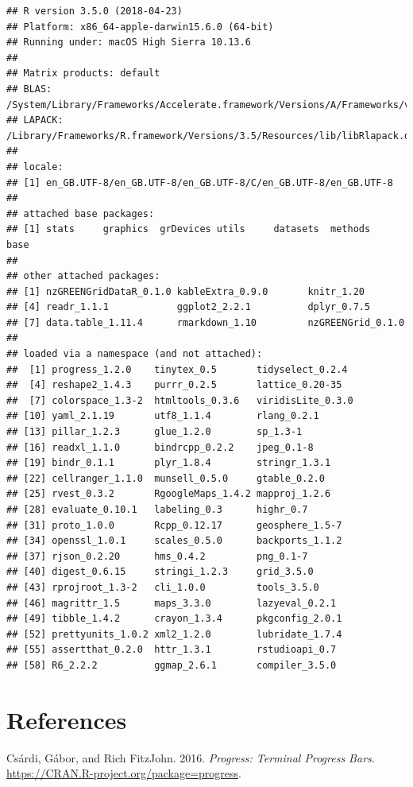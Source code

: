 \documentclass[]{article}
\begin{document}
\begin{verbatim}
## R version 3.5.0 (2018-04-23)
## Platform: x86_64-apple-darwin15.6.0 (64-bit)
## Running under: macOS High Sierra 10.13.6
## 
## Matrix products: default
## BLAS: /System/Library/Frameworks/Accelerate.framework/Versions/A/Frameworks/vecLib.framework/Versions/A/libBLAS.dylib
## LAPACK: /Library/Frameworks/R.framework/Versions/3.5/Resources/lib/libRlapack.dylib
## 
## locale:
## [1] en_GB.UTF-8/en_GB.UTF-8/en_GB.UTF-8/C/en_GB.UTF-8/en_GB.UTF-8
## 
## attached base packages:
## [1] stats     graphics  grDevices utils     datasets  methods   base     
## 
## other attached packages:
## [1] nzGREENGridDataR_0.1.0 kableExtra_0.9.0       knitr_1.20            
## [4] readr_1.1.1            ggplot2_2.2.1          dplyr_0.7.5           
## [7] data.table_1.11.4      rmarkdown_1.10         nzGREENGrid_0.1.0     
## 
## loaded via a namespace (and not attached):
##  [1] progress_1.2.0    tinytex_0.5       tidyselect_0.2.4 
##  [4] reshape2_1.4.3    purrr_0.2.5       lattice_0.20-35  
##  [7] colorspace_1.3-2  htmltools_0.3.6   viridisLite_0.3.0
## [10] yaml_2.1.19       utf8_1.1.4        rlang_0.2.1      
## [13] pillar_1.2.3      glue_1.2.0        sp_1.3-1         
## [16] readxl_1.1.0      bindrcpp_0.2.2    jpeg_0.1-8       
## [19] bindr_0.1.1       plyr_1.8.4        stringr_1.3.1    
## [22] cellranger_1.1.0  munsell_0.5.0     gtable_0.2.0     
## [25] rvest_0.3.2       RgoogleMaps_1.4.2 mapproj_1.2.6    
## [28] evaluate_0.10.1   labeling_0.3      highr_0.7        
## [31] proto_1.0.0       Rcpp_0.12.17      geosphere_1.5-7  
## [34] openssl_1.0.1     scales_0.5.0      backports_1.1.2  
## [37] rjson_0.2.20      hms_0.4.2         png_0.1-7        
## [40] digest_0.6.15     stringi_1.2.3     grid_3.5.0       
## [43] rprojroot_1.3-2   cli_1.0.0         tools_3.5.0      
## [46] magrittr_1.5      maps_3.3.0        lazyeval_0.2.1   
## [49] tibble_1.4.2      crayon_1.3.4      pkgconfig_2.0.1  
## [52] prettyunits_1.0.2 xml2_1.2.0        lubridate_1.7.4  
## [55] assertthat_0.2.0  httr_1.3.1        rstudioapi_0.7   
## [58] R6_2.2.2          ggmap_2.6.1       compiler_3.5.0
\end{verbatim}

\section*{References}\label{references}

\hypertarget{refs}{}
\hypertarget{ref-progress}{}
Csárdi, Gábor, and Rich FitzJohn. 2016. \emph{Progress: Terminal
Progress Bars}. \url{https://CRAN.R-project.org/package=progress}.
\end{document}
